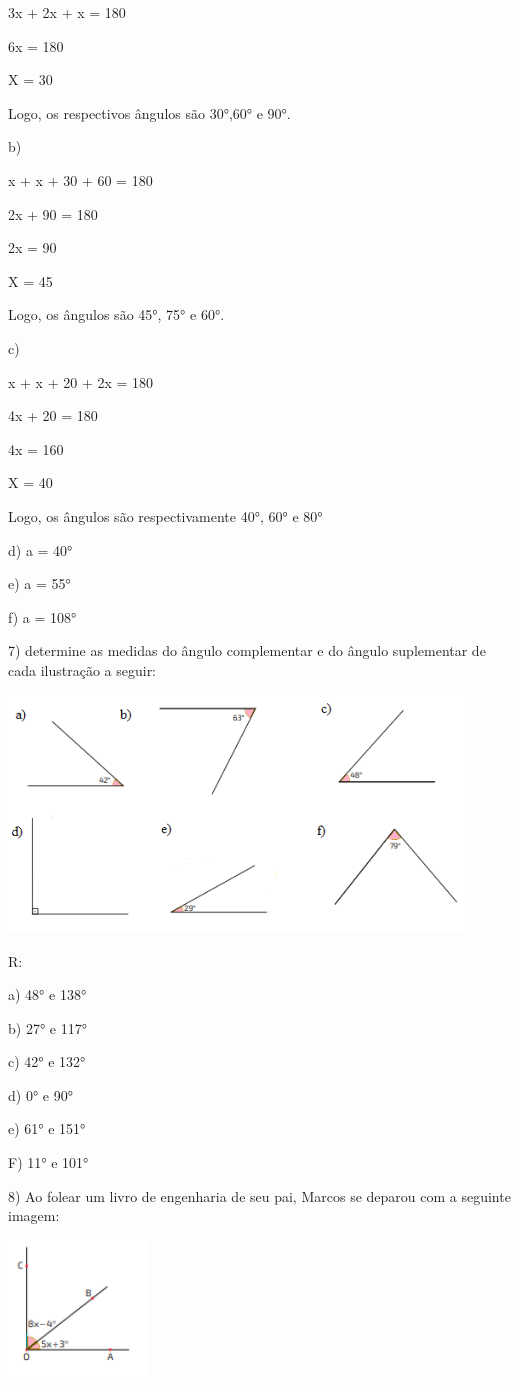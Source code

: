 3x + 2x + x = 180

6x = 180

X = 30

Logo, os respectivos ângulos são 30°,60° e 90°.

b)

x + x + 30 + 60 = 180

2x + 90 = 180

2x = 90

X = 45

Logo, os ângulos são 45°, 75° e 60°.

c)

x + x + 20 + 2x = 180

4x + 20 = 180

4x = 160

X = 40

Logo, os ângulos são respectivamente 40°, 60° e 80°

d) a = 40°

e) a = 55°

f) a = 108°

7) determine as medidas do ângulo complementar e do ângulo suplementar
de cada ilustração a seguir:

\includegraphics[width=4.81667in,height=2.48373in]{./imgSAEB_8_MAT/media/image30.png}

R:

a) 48° e 138°

b) 27° e 117°

c) 42° e 132°

d) 0° e 90°

e) 61° e 151°

F) 11° e 101°

8) Ao folear um livro de engenharia de seu pai, Marcos se deparou com a
seguinte imagem:

\includegraphics[width=1.47134in,height=1.42708in]{./imgSAEB_8_MAT/media/image31.png}

